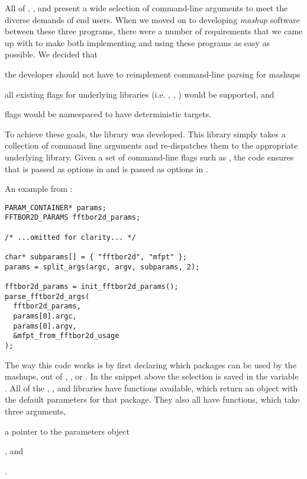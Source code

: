 \documentclass[11pt]{article}
\begin{document}

All of \fft, \rnamfpt, and \rnaeq present a wide selection of command-line arguments to meet the diverse demands of end users. When we moved on to developing {\em mashup} software between these three programs, there were a number of requirements that we came up with to make both implementing and using these programs as easy as possible. We decided that
\begin{inparaenum}
  \item the developer should not have to reimplement command-line parsing for mashups
  \item all existing flags for underlying libraries (i.e. \fft, \rnamfpt, \rnaeq) would be supported, and
  \item flags would be namespaced to have deterministic targets.
\end{inparaenum}

To achieve these goals, the library \multiParam was developed. This library simply takes a collection of command line arguments and re-dispatches them to the appropriate underlying library. Given a set of command-line flags such as , the code ensures that \fft is passed  as options in  and \rnamfpt is passed  as options in .


An example from :
\begin{verbatim}
PARAM_CONTAINER* params;
FFTBOR2D_PARAMS fftbor2d_params;

/* ...omitted for clarity... */

char* subparams[] = { "fftbor2d", "mfpt" };
params = split_args(argc, argv, subparams, 2);

fftbor2d_params = init_fftbor2d_params();
parse_fftbor2d_args(
  fftbor2d_params,
  params[0].argc,
  params[0].argv,
  &mfpt_from_fftbor2d_usage
);
\end{verbatim}

The way this code works is by first declaring which packages can be used by the mashups, out of , , or . In the snippet above the selection is saved in the variable . All of the \fft, \rnamfpt, and \rnaeq libraries have  functions available, which return an object with the default parameters for that package. They also all have  functions, which take three arguments,
\begin{inparaenum}
  [\itshape 1\upshape)]
  \item a pointer to the parameters object
  \item {}, and
  \item {}
\end{inparaenum}
.
\end{document}
